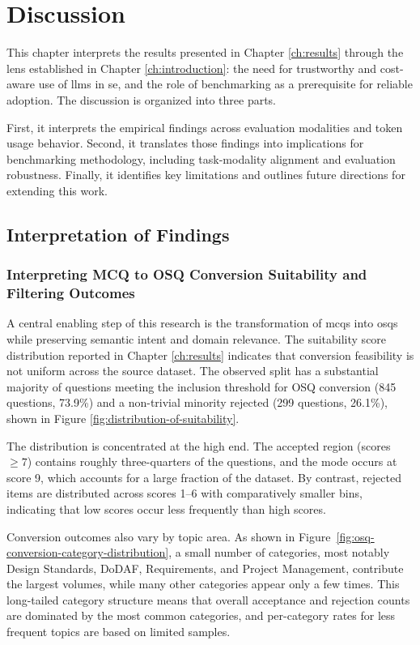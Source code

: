 \chapter{Discussion}\label{ch:discussion}

This chapter interprets the results presented in Chapter \ref{ch:results} through the lens established in Chapter \ref{ch:introduction}: the need for trustworthy and cost-aware use of \acp{llm} in \ac{se}, and the role of benchmarking as a prerequisite for reliable adoption. The discussion is organized into three parts. 

First, it interprets the empirical findings across evaluation modalities and token usage behavior. Second, it translates those findings into implications for benchmarking methodology, including task-modality alignment and evaluation robustness. Finally, it identifies key limitations and outlines future directions for extending this work.


\section{Interpretation of Findings}\label{sec:interpretation_findings}
\subsection{Interpreting MCQ to OSQ Conversion Suitability and Filtering Outcomes}

A central enabling step of this research is the transformation of \acp{mcq} into \acp{osq} while preserving semantic intent and domain relevance. The suitability score distribution reported in Chapter \ref{ch:results} indicates that conversion feasibility is not uniform across the source dataset. The observed split has a substantial majority of questions meeting the inclusion threshold for OSQ conversion (845 questions, 73.9\%) and a non-trivial minority rejected (299 questions, 26.1\%), shown in Figure \ref{fig:distribution-of-suitability}.

The distribution is concentrated at the high end. The accepted region (scores $\geq 7$) contains roughly three-quarters of the questions, and the mode occurs at score 9, which accounts for a large fraction of the dataset. By contrast, rejected items are distributed across scores 1--6 with comparatively smaller bins, indicating that low scores occur less frequently than high scores.

Conversion outcomes also vary by topic area. As shown in Figure~\ref{fig:osq-conversion-category-distribution}, a small number of categories, most notably Design Standards, DoDAF, Requirements, and Project Management, contribute the largest volumes, while many other categories appear only a few times. This long-tailed category structure means that overall acceptance and rejection counts are dominated by the most common categories, and per-category rates for less frequent topics are based on limited samples.

